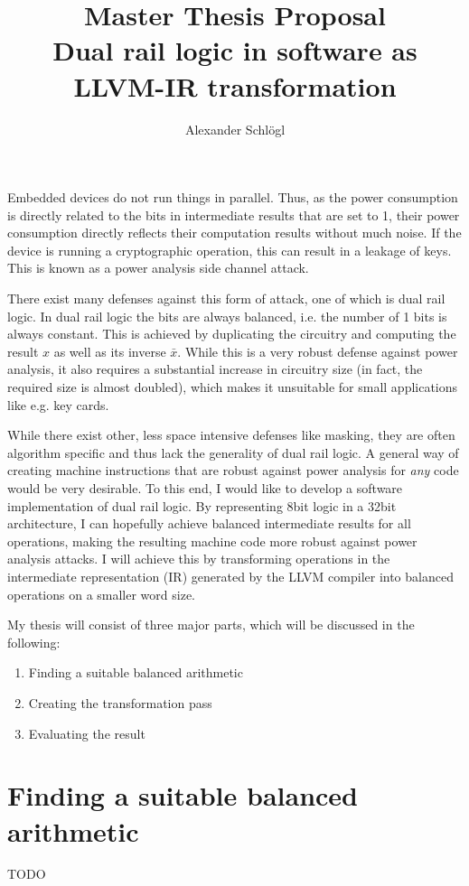\documentclass{article}
\title{%
	Master Thesis Proposal\\
	\large Dual rail logic in software as LLVM-IR transformation}
\author{Alexander Schl\"ogl}
\begin{document}
\maketitle

Embedded devices do not run things in parallel.
Thus, as the power consumption is directly related to the bits in intermediate results that are set to 1, their power consumption directly reflects their computation results without much noise.
If the device is running a cryptographic operation, this can result in a leakage of keys.
This is known as a power analysis side channel attack. %

There exist many defenses against this form of attack, one of which is dual rail logic.
In dual rail logic the bits are always balanced, i.e. the number of 1 bits is always constant.
This is achieved by duplicating the circuitry and computing the result $x$ as well as its inverse $\bar{x}$.
While this is a very robust defense against power analysis, it also requires a substantial increase in circuitry size (in fact, the required size is almost doubled), which makes it unsuitable for small applications like e.g. key cards.

While there exist other, less space intensive defenses like masking, they are often algorithm specific and thus lack the generality of dual rail logic. %
A general way of creating machine instructions that are robust against power analysis for \emph{any} code would be very desirable.
To this end, I would like to develop a software implementation of dual rail logic.
By representing 8bit logic in a 32bit architecture, I can hopefully achieve balanced intermediate results for all operations, making the resulting machine code more robust against power analysis attacks.
I will achieve this by transforming operations in the intermediate representation (IR) generated by the LLVM compiler into balanced operations on a smaller word size.

My thesis will consist of three major parts, which will be discussed in the following:
\begin{enumerate}
	\item Finding a suitable balanced arithmetic
	\item Creating the transformation pass
	\item Evaluating the result
\end{enumerate}

\section*{Finding a suitable balanced arithmetic}
TODO
\end{document}

